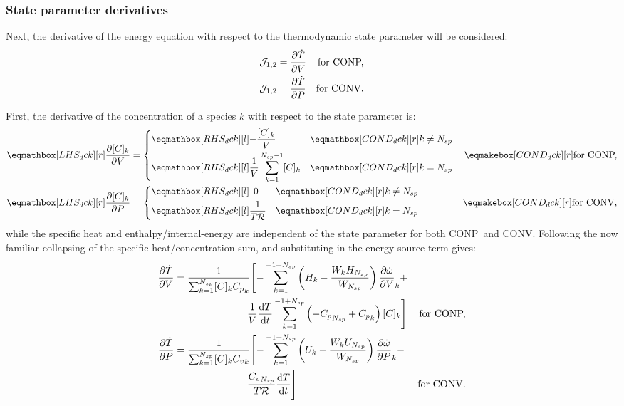 \documentclass[12pt]{article}
\newcommand{\ns}{N_{sp}}
\newcommand{\conp}{CONP}
\newcommand{\conv}{CONV}
\newcommand{\dconp}{\ifmmode\text{for \conp,}\else for \conp,\fi}
\newcommand{\dconv}{\ifmmode\text{for \conv,}\else for \conv.\fi}
\newcommand{\Ru}{\mathcal{R}}
\begin{document}
\subsubsection{State parameter derivatives}
Next, the derivative of the energy equation with respect to the thermodynamic state parameter will be considered:
\begin{subequations}
\begin{align}
 \mathcal{J}_{1, 2} & = \frac{\partial\dot{T}}{\partial{V}} & \text{\dconp} \\
 \mathcal{J}_{1, 2} & = \frac{\partial\dot{T}}{\partial{P}} & \text{\dconv}
\end{align}
\end{subequations}

First, the derivative of the concentration of a species $k$ with respect to the state parameter is:
\begin{subequations}
 \label{e:dck_de}
 \begin{align}
 \lhs{dck}{\frac{\partial [C]_{k} }{\partial V }} &=
  \begin{dcases}
  \rhs{dck}{-\frac{[C]_{k}}{V}} & \mathcond{dck}{k \ne \ns} \\
  \rhs{dck}{\frac{1}{V} \sum_{k=1}^{\ns  - 1} [C]_{k}} & \mathcond{dck}{k = \ns}
 \end{dcases}&\cond{dck}{\dconp} \\
 \lhs{dck}{\frac{\partial [C]_{k} }{\partial P }} &=
 \begin{dcases}
   \rhs{dck}{\mathindent[s]0} & \mathcond{dck}{k \ne \ns} \\
   \rhs{dck}{\frac{1}{T \Ru}} & \mathcond{dck}{k = \ns}
 \end{dcases}&\cond{dck}{\dconv}
 \end{align}
\end{subequations}
while the specific heat and enthalpy\slash internal-energy are independent of the state parameter for both \conp~and \conv.
Following the now familiar collapsing of the specific-heat\slash concentration sum, and substituting in the energy source term gives:
\begin{subequations}
\begin{align}
 \frac{\partial\dot{T}}{\partial{V}} &= \frac{1}{\sum_{k=1}^{\ns} [C]_{k} {C_p}_{k}} \Biggl[ - \sum_{k=1}^{-1 + \ns} \left(H_{k} - \frac{W_{k} H_{\ns}}{W_{\ns}}\right) \frac{\partial \dot{\omega} }{\partial V }_{k} + & \nonumber \\
				     & \mathindent[largerindentand] \frac{1}{V} \frac{\text{d} T }{\text{d} t } \sum_{k=1}^{-1 + \ns} \left(- {C_p}_{\ns} + {C_p}_{k}\right) [C]_{k}\Biggr] & \text{\dconp} \\
 \frac{\partial\dot{T}}{\partial{P}} &= \frac{1}{\sum_{k=1}^{\ns} [C]_{k} {C_v}_{k}} \Biggl[- \sum_{k=1}^{-1 + \ns} \left(U_{k} - \frac{W_{k} U_{\ns}}{W_{\ns}}\right) \frac{\partial \dot{\omega} }{\partial P }_{k} - & \nonumber \\
				     & \mathindent[largerindentand] \frac{{C_v}_{\ns}}{T \Ru} \frac{\text{d} T }{\text{d} t } \Biggr] & \text{\dconv}
\end{align}
\end{subequations}
\end{document}
